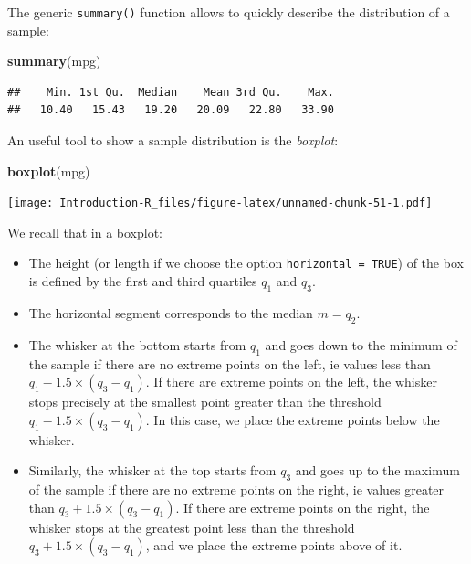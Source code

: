\documentclass[]{book}
\newenvironment{Shaded}{\begin{snugshade}}{\end{snugshade}}
\newcommand{\KeywordTok}[1]{\textcolor[rgb]{0.13,0.29,0.53}{\textbf{#1}}}
\newcommand{\NormalTok}[1]{#1}
\providecommand{\tightlist}{%
  \setlength{\itemsep}{0pt}\setlength{\parskip}{0pt}}
\begin{document}
The generic \texttt{summary()} function allows to quickly describe the distribution of a sample:

\begin{Shaded}
\begin{Highlighting}[]
\KeywordTok{summary}\NormalTok{(mpg)}
\end{Highlighting}
\end{Shaded}

\begin{verbatim}
##    Min. 1st Qu.  Median    Mean 3rd Qu.    Max. 
##   10.40   15.43   19.20   20.09   22.80   33.90
\end{verbatim}

An useful tool to show a sample distribution is the \emph{boxplot}:

\begin{Shaded}
\begin{Highlighting}[]
\KeywordTok{boxplot}\NormalTok{(mpg)}
\end{Highlighting}
\end{Shaded}

\texttt{[image: Introduction-R\_files/figure-latex/unnamed-chunk-51-1.pdf]}

We recall that in a boxplot:

\begin{itemize}
\tightlist
\item
  The height (or length if we choose the option \texttt{horizontal\ =\ TRUE}) of the box is defined by the first and third quartiles \(q_1\) and \(q_3\).
\item
  The horizontal segment corresponds to the median \(m = q_2\).
\item
  The whisker at the bottom starts from \(q_1\) and goes down to the minimum of the sample if there are no extreme points on the left, ie values less than \(q_1-1.5\times (q_3-q_1)\). If there are extreme points on the left, the whisker stops precisely at the smallest point greater than the threshold \(q_1-1.5\times (q_3-q_1)\). In this case, we place the extreme points below the whisker.
\item
  Similarly, the whisker at the top starts from \(q_3\) and goes up to the maximum of the sample if there are no extreme points on the right, ie values greater than \(q_3+1.5 \times(q_3-q_1)\). If there are extreme points on the right, the whisker stops at the greatest point less than the threshold \(q_3+1.5\times (q_3-q_1)\), and we place the extreme points above of it.
\end{itemize}
\end{document}
